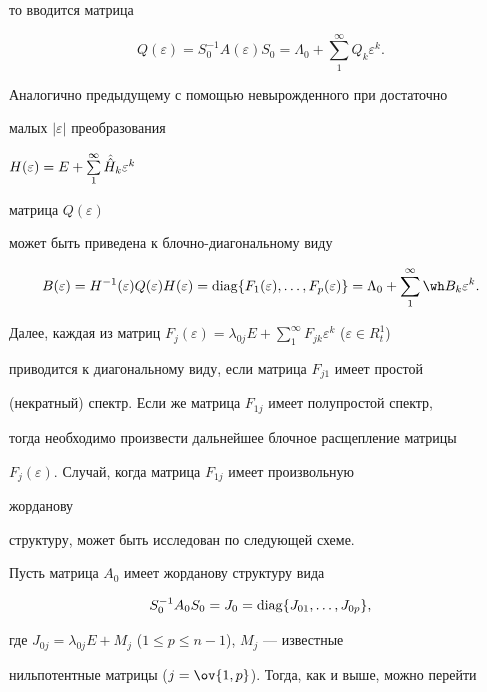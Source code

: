 то вводится матрица 


$$ 


Q(\varepsilon)=S^{-1}_0A(\varepsilon)S_0=\Lambda_0+ 


\sum^\infty_1 Q_k\varepsilon^k. 


$$ 


Аналогично предыдущему с помощью невырожденного при достаточно 


малых $|\varepsilon|$ преобразования 


$H(\varepsilon)=E+\sum\limits^\infty_1\Hat{\Hat H}_k\varepsilon^k$ 


матрица $Q(\varepsilon)$ 


может быть приведена к блочно-диагональному виду 


$$ 


B(\varepsilon)=H^{-1}(\varepsilon)Q(\varepsilon) 


H(\varepsilon)=\diag\{F_1(\varepsilon),\dotsc, 


F_p(\varepsilon)\}=\Lambda_0+ 


\sum^\infty_1\wh B_k\varepsilon^k. 


$$ 


Далее, каждая из матриц $F_j(\varepsilon)=\lambda_{0j}E+ 


\sum\limits^\infty_1 F_{jk}\varepsilon^k$ ($\varepsilon\in R_t^1$) 


приводится к диагональному виду, если матрица $F_{j1}$ имеет простой 


(некратный) спектр. Если же матрица $F_{1j}$ имеет полупростой спектр, 


тогда необходимо произвести дальнейшее блочное расщепление матрицы 


$F_j(\varepsilon)$. Случай, когда матрица $F_{1j}$ имеет произвольную 


жорданову 


структуру, может быть исследован по следующей схеме. 


 


Пусть матрица $A_0$ имеет жорданову структуру вида 


$$ 


S^{-1}_0A_0S_0=J_0=\diag\{J_{01},\dotsc,J_{0p}\}, 


$$ 


где $J_{0j}=\lambda_{0j}E+M_j$ ($1\le p\le n-1$), $M_j$ --- известные 


нильпотентные матрицы ($j=\ov{1,p}$). Тогда, как и выше, можно перейти 


